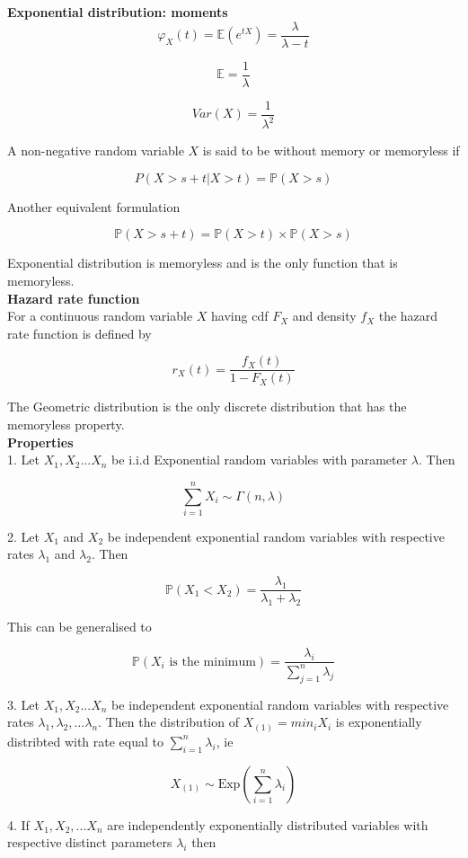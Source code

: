 \textbf{Exponential distribution: moments}\\

$$\varphi_X(t) = \mathbb{E}(e^{tX}) = \frac{\lambda}{\lambda -t} $$

$$\mathbb{E} = \frac{1}{\lambda}$$

$$Var(X) = \frac{1}{\lambda^2}$$

A non-negative random variable $X$ is said to be without memory or memoryless if 

$$P(X >s + t|X > t) = \mathbb{P}(X > s)$$

Another equivalent formulation

$$\mathbb{P}(X > s+t) = \mathbb{P}(X > t) \times \mathbb{P}(X > s)$$

Exponential distribution is memoryless and is the only function that is memoryless.\\

\textbf{Hazard rate function}\\

For a continuous random variable $X$ having cdf $F_X$ and density $f_X$ the hazard rate function is defined by

$$r_X(t) = \frac{f_X(t)}{1 - F_X(t)}$$

The Geometric distribution is the only discrete distribution that has the memoryless property.\\

\textbf{Properties}\\
1. Let $X_1, X_2...X_n$ be i.i.d Exponential random variables with parameter $\lambda$. Then

$$\sum_{i=1}^n X_i \sim \Gamma(n,\lambda)$$

2. Let $X_1$ and $X_2$ be independent exponential random variables with respective rates $\lambda_1$ and $\lambda_2$. Then

$$\mathbb{P}(X_1 < X_2) = \frac{\lambda_1}{\lambda_1 + \lambda_2}$$

This can be generalised to

$$\mathbb{P}(X_i \text{ is the minimum} ) = \frac{\lambda_i}{\sum_{j=1}^n \lambda_j}$$

3. Let $X_1, X_2...X_n$ be independent exponential random variables with respective rates $\lambda_1, \lambda_2, ... \lambda_n$. Then the distribution of $X_{(1)} = min_i X_i$ is exponentially distribted with rate equal to $\sum_{i=1}^n \lambda_i$, ie

$$X_{(1)} \sim \text{Exp}(\sum_{i=1}^n \lambda_i)$$

4. If $X_1, X_2,...X_n$ are independently exponentially distributed variables with respective distinct parameters $\lambda_i$ then

